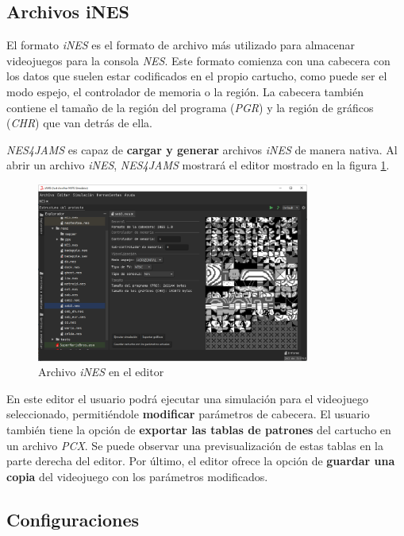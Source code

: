 \subsection{Archivos iNES}\label{subsec:archivos-nes}

El formato \textit{iNES} es el formato de archivo más utilizado
para almacenar videojuegos para la consola \textit{NES}.
Este formato comienza con una cabecera con los datos que suelen
estar codificados en el propio cartucho, como puede ser el modo
espejo, el controlador de memoria o la región.
La cabecera también contiene el tamaño de la región del
programa (\textit{PGR}) y la región de gráficos (\textit{CHR})
que van detrás de ella.

\textit{NES4JAMS} es capaz de \textbf{cargar y generar} archivos
\textit{iNES} de manera nativa.
Al abrir un archivo \textit{iNES}, \textit{NES4JAMS} mostrará
el editor mostrado en la figura \ref{fig:nes-ines-editor}.

\begin{figure}[h]
    \centering
    \includegraphics[width=0.8\textwidth]{images/nes/nes-ines-editor}
    \caption{Archivo \textit{iNES} en el editor}
    \label{fig:nes-ines-editor}
\end{figure}

En este editor el usuario podrá ejecutar una simulación
para el videojuego seleccionado, permitiéndole \textbf{modificar}
parámetros de cabecera.
El usuario también tiene la opción de \textbf{exportar las tablas
de patrones} del cartucho en un archivo \textit{PCX}.
Se puede observar una previsualización de estas tablas en la parte derecha del editor.
Por último, el editor ofrece la opción de \textbf{guardar una copia}
del videojuego con los parámetros modificados.

\subsection{Configuraciones}\label{subsec:configuraciones}

